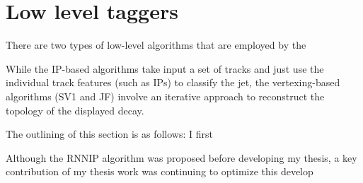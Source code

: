 \section{Low level taggers}

There are two types of low-level algorithms that are employed by the 

While the IP-based algorithms take input a set of tracks and just use the individual track features (such as IPs) to classify the jet, the vertexing-based algorithms (SV1 and JF) involve an iterative approach to reconstruct the topology of the displayed decay.


The outlining of this section is as follows: I first 

Although the RNNIP algorithm was proposed before developing my thesis, a key contribution of my thesis work was continuing to optimize this develop







\FloatBarrier
\clearpage


%



